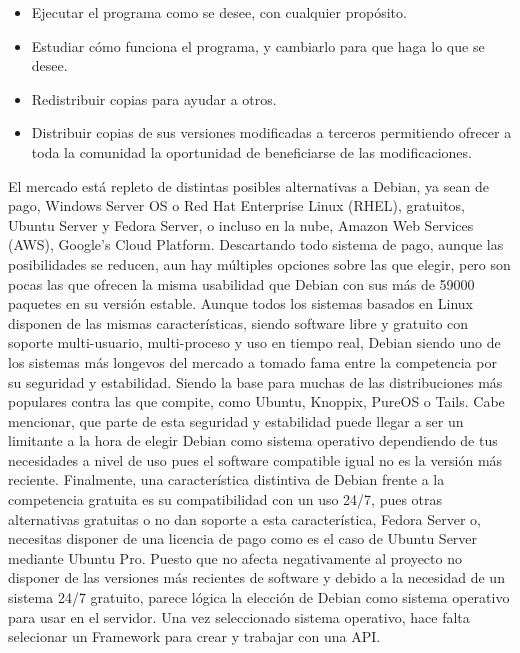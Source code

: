 \begin{itemize}
	\item Ejecutar el programa como se desee, con cualquier propósito.
	\item Estudiar cómo funciona el programa, y cambiarlo para que haga lo que se desee.
	\item Redistribuir copias para ayudar a otros.
	\item Distribuir copias de sus versiones modificadas a terceros permitiendo ofrecer a toda la comunidad la oportunidad de beneficiarse de las modificaciones.
\end{itemize}

El mercado está repleto de distintas posibles alternativas a Debian, ya sean de pago, Windows Server OS o Red Hat Enterprise Linux (RHEL), gratuitos, Ubuntu Server y Fedora Server, o incluso en la nube, Amazon Web Services (AWS), Google’s Cloud Platform.
\newline
\newline
Descartando todo sistema de pago, aunque las posibilidades se reducen, aun hay múltiples opciones sobre las que elegir, pero son pocas las que ofrecen la misma usabilidad que Debian con sus más de 59000 paquetes en su versión estable. \cite{DebWhy}
\newline
\newline
Aunque todos los sistemas basados en Linux disponen de las mismas características, siendo software libre y gratuito con soporte multi-usuario, multi-proceso y uso en tiempo real, Debian siendo uno de los sistemas más longevos del mercado a tomado fama entre la competencia por su seguridad y estabilidad. Siendo la base para muchas de las distribuciones más populares contra las que compite, como Ubuntu, Knoppix, PureOS o Tails.
\newline
\newline
Cabe mencionar, que parte de esta seguridad y estabilidad puede llegar a ser un limitante a la hora de elegir Debian como sistema operativo dependiendo de tus necesidades a nivel de uso pues el software compatible igual no es la versión más reciente.
\newline
\newline
Finalmente, una característica distintiva de Debian frente a la competencia gratuita es su compatibilidad con un uso 24/7, pues otras alternativas gratuitas o no dan soporte a esta característica, Fedora Server o, necesitas disponer de una licencia de pago como es el caso de Ubuntu Server mediante Ubuntu Pro.
\newline
\newline
Puesto que no afecta negativamente al proyecto no disponer de las versiones más recientes de software y debido a la necesidad de un sistema 24/7 gratuito, parece lógica la elección de Debian como sistema operativo para usar en el servidor.\newline
\newline
Una vez seleccionado sistema operativo, hace falta selecionar un Framework para crear y trabajar con una API.

